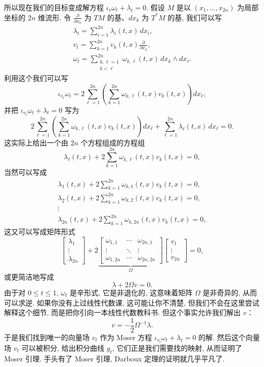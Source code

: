 所以现在我们的目标变成解方程 $\iota_v\omega_t+\lambda_t=0$. 假设 $M$ 是以 $(x_1,\ldots,x_{2n})$ 为局部坐标的 $2n$ 维流形. 令 $\frac{\partial}{\partial x_k}$ 为 $TM$ 的基、$dx_k$ 为 $T^*M$ 的基, 我们可以写
\begin{align*}
\lambda_t=\sum_{i=1}^{2n}\lambda_i(t,x)\,dx_i, \\
v_t=\sum_{k=1}^{2n}v_k(t,x)\frac{\partial}{\partial x_k}, \\
\omega_t=\sum_{\substack{k,\ell=1\\k<\ell}}^{2n}\omega_{k,\ell}(t,x)\,dx_k\wedge dx_\ell.
\end{align*}
利用这个我们可以写
\[
\iota_{v_t}\omega_t=2\sum_{\ell=1}^{2n}\left(\sum_{k=1}^{2n}\omega_{k,\ell}(t,x)v_k(t,x)\right)dx_\ell,
\]
并把 $\iota_{v_t}\omega_t+\lambda_t=0$ 写为
\[
2\sum_{\ell=1}^{2n}\left(\sum_{k=1}^{2n}\omega_{k,\ell}(t,x)v_k(t,x)\right)dx_\ell+\sum_{\ell=1}^{2n}\lambda_\ell(t,x)\,dx_\ell=0.
\]
这实际上给出一个由 $2n$ 个方程组成的方程组
\[
\lambda_\ell(t,x)+2\sum_{k=1}^{2n}\omega_{k,\ell}(t,x)v_k(t,x)=0,
\]
当然可以写成
\begin{align*}
\lambda_1(t,x)+2\sum_{k=1}^{2n}\omega_{k,1}(t,x)v_k(t,x)=0, \\
\lambda_2(t,x)+2\sum_{k=1}^{2n}\omega_{k,2}(t,x)v_k(t,x)=0, \\
\vdots \\
\lambda_{2n}(t,x)+2\sum_{k=1}^{2n}\omega_{k,2n}(t,x)v_k(t,x)=0,
\end{align*}
这又可以写成矩阵形式
\[
\begin{bmatrix}\lambda_1\\\vdots\\\lambda_{2n}\end{bmatrix}
+2\underbrace{\begin{bmatrix}\omega_{1,1}&\cdots&\omega_{2n,1}\\\vdots&\ddots&\vdots\\\omega_{1,2n}&\cdots&\omega_{2n,2n}\end{bmatrix}}_{\Omega}
\begin{bmatrix}v_1\\\vdots\\v_{2n}\end{bmatrix}=0,
\]
或更简洁地写成
\[
\lambda+2\Omega v=0.
\]
由于对 $0\leq t\leq1$, $\omega_t$ 是辛形式, 它是非退化的, 这意味着矩阵 $\Omega$ 是非奇异的, 从而可以求逆. 如果你没有上过线性代数课, 这可能让你不清楚, 但我们不会在这里尝试解释这个细节, 而是把你引向一本线性代数教科书. 但这个事实允许我们解出 $v$：
\[
v=-\frac{1}{2}\Omega^{-1}\lambda.
\]
于是我们找到唯一的向量场 $v_t$ 作为 Moser 方程 $\iota_{v_t}\omega_t+\lambda_t=0$ 的解. 然后这个向量场 $v_t$ 可以被积分, 给出积分曲线 $g_t$, 它们正是我们需要找的映射, 从而证明了 Moser 引理. 手头有了 Moser 引理, Darboux 定理的证明就几乎平凡了.

